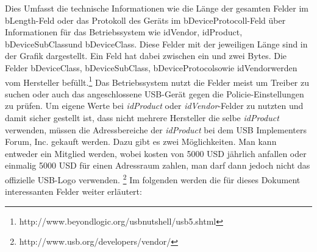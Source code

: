 Dies Umfasst die technische Informationen wie die Länge der gesamten Felder im \glqq bLength\grqq-Feld oder das Protokoll des Geräts im \glqq bDeviceProtocoll\grqq-Feld über Informationen für das Betriebssystem wie \glqq idVendor\grqq, \glqq idProduct\grqq, \glqq bDeviceSubClass\grqq und \glqq bDeviceClass\grqq. Diese Felder mit der jeweiligen Länge sind in der Grafik dargestellt. Ein Feld hat dabei zwischen ein und zwei Bytes. Die Felder \glqq bDeviceClass\grqq, \glqq bDeviceSubClass\grqq, \glqq bDeviceProtocol\grqq sowie \glqq idVendor\grqq werden vom Hersteller befüllt.\footnote{http://www.beyondlogic.org/usbnutshell/usb5.shtml} Das Betriebssystem nutzt die Felder meist um Treiber zu suchen oder auch das angeschlossene USB-Gerät gegen die Policie-Einstellungen zu prüfen. Um eigene Werte bei \textit{idProduct} oder \textit{idVendor}-Felder zu nutzten und damit sicher gestellt ist, dass nicht mehrere Hersteller die selbe \textit{idProduct} verwenden, müssen die Adressbereiche der \textit{idProduct} bei dem USB Implementers Forum, Inc. gekauft werden. Dazu gibt es zwei Möglichkeiten. Man kann entweder ein Mitglied werden, wobei kosten von 5000 USD jährlich anfallen oder einmalig 5000 USD für einen Adressraum zahlen, man darf dann jedoch nicht das offizielle USB-Logo verwenden. \footnote{http://www.usb.org/developers/vendor/} Im folgenden werden die für dieses Dokument interessanten Felder weiter erläutert:

